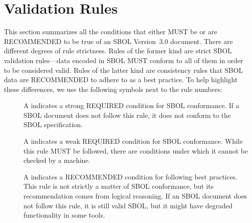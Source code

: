 \newcommand{\printValid}{\validRule{sbol-\arabic{sbolCtr}\addtocounter{sbolCtr}{1}}}
\newcommand{\printComplete}{\completeRule{sbol-\arabic{sbolCtr}\addtocounter{sbolCtr}{1}}}
\newcommand{\printWarning}{\consistencyRule{sbol-\arabic{sbolCtr}\addtocounter{sbolCtr}{1}}}
\newcommand{\printModeling}{\modelingRule{sbol-\arabic{sbolCtr}\addtocounter{sbolCtr}{1}}}

\section{Validation Rules}
\label{validation}

This section summarizes all the conditions that either MUST be or 
are RECOMMENDED to be true of an SBOL Version~3.0 document. There are different degrees of rule strictness.  
Rules of the former kind are strict SBOL validation rules---data encoded in SBOL MUST conform to
all of them in order to be considered valid. Rules of the latter kind
are consistency rules that SBOL data are RECOMMENDED to adhere to as a best practice.  To help highlight these differences, we use the
following symbols next to the rule numbers:


\begin{description}
\item[\hspace*{6.5pt}\vSymbol\vsp] A \vSymbolName indicates a strong
  REQUIRED condition for SBOL conformance. If a SBOL document does not follow this rule, it does not conform to the SBOL
  specification.  

\item[\hspace*{6.5pt}\rSymbol\rsp] A \rSymbolName indicates a weak
  REQUIRED condition for SBOL conformance. While this rule MUST be followed, there are conditions under which it cannot be checked by a machine. 

\item[\hspace*{6.5pt}\mSymbol\msp] A \mSymbolName indicates a 
  RECOMMENDED condition for following best practices.  This rule is not strictly a matter of SBOL conformance, but its recommendation comes from logical
  reasoning.  If an SBOL document does not follow this rule, it is still valid SBOL, but it might have degraded functionality in some tools.  
\end{description}

